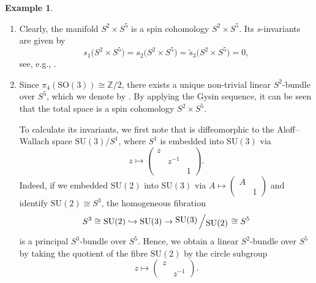 \documentclass[pdftex]{sigma}
\numberwithin{equation}{section}
\theoremstyle{definition}
\newtheorem{Example}[Theorem]{Example}
\numberwithin{table}{section}
\newcommand{\Z}{\mathbb{Z}}
\newcommand{\bigslant}[2]{{\raisebox{.2em}{$#1$}\left/\raisebox{-.2em}{$#2$}\right.}}
\newcommand{\ttimes}{\mathrel{\widetilde{\times} }}
\begin{document}
\begin{Example}\label{EX:spin_cohom_S2xS5}\qquad
	\begin{enumerate}\itemsep=0pt
		\item[$(1)$] Clearly, the manifold $S^2\times S^5$ is a spin cohomology $S^2\times S^5$. Its $s$-invariants are given by
		\[ s_1\bigl(S^2\times S^5\bigr)=s_2\bigl(S^2\times S^5\bigr)=\tilde{s}_3\bigl(S^2\times S^5\bigr)=0, \]
		see, e.g., \cite[Lemma~4]{Xu25}.
		\item[$(2)$] Since $\pi_4(\mathrm{SO}(3))\cong\Z/2$, there exists a unique non-trivial linear $S^2$-bundle over $S^5$, which we denote by \smash{$S^5\ttimes S^2\to S^5$}. By applying the Gysin sequence, it can be seen that the total space \smash{$S^5\ttimes S^2$} is a spin cohomology $S^2\times S^5$.
		
		To calculate its invariants, we first note that \smash{$S^5\ttimes S^2$} is diffeomorphic to the Aloff--Wallach space $\mathrm{SU}(3)/S^1$, where $S^1$ is embedded into $\mathrm{SU}(3)$ via
		\[ z\mapsto\begin{pmatrix}
			z & & \\ & z^{-1} & \\ & & 1
		\end{pmatrix}. \]
		Indeed, if we embedded $\mathrm{SU}(2)$ into $\mathrm{SU}(3)$ via $A\mapsto \left(\begin{smallmatrix}
			A &\\ & 1
		\end{smallmatrix}\right)$ and identify $\mathrm{SU}(2)\cong S^3$, the homogeneous fibration
		\[ S^3\cong \mathrm{SU}(2)\hookrightarrow\mathrm{SU}(3)\to\bigslant{\mathrm{SU}(3)}{\mathrm{SU}(2)}\cong S^5 \]
		is a principal $S^3$-bundle over $S^5$. Hence, we obtain a linear $S^2$-bundle over $S^5$ by taking the quotient of the fibre $\mathrm{SU}(2)$ by the circle subgroup
		\[ z\mapsto  \begin{pmatrix}
			z &\\&z^{-1}
		\end{pmatrix}. \]
		

\end{enumerate}
\end{Example}
\end{document}
